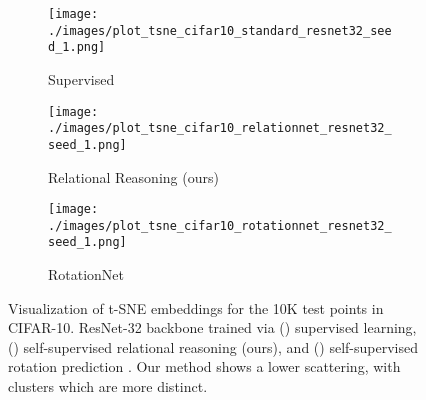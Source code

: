 \documentclass{article}
\begin{document}
\begin{figure}[H]
    \begin{subfigure}[t]{0.333\textwidth}
       \centering
        \texttt{[image: ./images/plot\_tsne\_cifar10\_standard\_resnet32\_seed\_1.png]}
        \caption{Supervised}
        \label{fig:tsne-supervised}
    \end{subfigure}
    \begin{subfigure}[t]{0.333\textwidth}
       \centering
        \texttt{[image: ./images/plot\_tsne\_cifar10\_relationnet\_resnet32\_seed\_1.png]}
        \caption{Relational Reasoning (ours)}
        \label{fig:tsne-relationat}
    \end{subfigure}
    \begin{subfigure}[t]{0.333\textwidth}
       \centering
        \texttt{[image: ./images/plot\_tsne\_cifar10\_rotationnet\_resnet32\_seed\_1.png]}
        \caption{RotationNet}
        \label{fig:tsne-rotation}
    \end{subfigure}
    \caption{Visualization of t-SNE embeddings for the 10K test points in CIFAR-10. ResNet-32 backbone trained via () supervised learning, () self-supervised relational reasoning (ours), and () self-supervised rotation prediction \citep{gidaris2018unsupervised}. Our method shows a lower scattering, with clusters which are more distinct.}
    \label{fig:tsne}
\end{figure}
\end{document}
